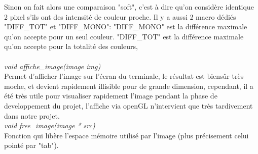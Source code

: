 \documentclass[12pt, letterpaper]{article}
\begin{document}
Sinon on fait alors une comparaison "soft", c'est à dire qu'on considère identique 2 pixel s'ils ont des intensité 
de couleur proche. Il y a aussi 2 macro dédiés "DIFF\_TOT" et "DIFF\_MONO":
"DIFF\_MONO" est la différence maximale qu'on accepte pour un seul couleur.
"DIFF\_TOT" est la différence maximale qu'on accepte pour la totalité des couleurs, 
\\\\
\textit{void affiche\_image(image img)}\\
Permet d'afficher l'image sur l'écran du terminale, le résultat est biensûr très moche, et devient 
rapidement illisible pour de grande dimension, cependant, il a été très utile pour visualiser rapidement 
l'image pendant la phase de developpement du projet, l'affiche via openGL n'intervient que très tardivement dans 
notre projet.\\
\textit{void free\_image(image * src)}\\
Fonction qui libère l'espace mémoire utilisé par l'image (plus précisement celui pointé par "tab").\\\\
\end{document}
